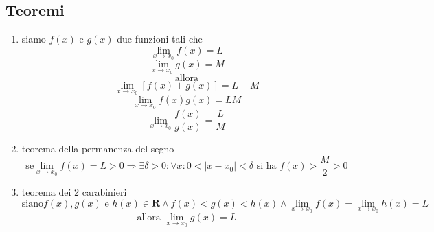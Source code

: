 \documentclass{exam}
\begin{document}
  \subsection{Teoremi}
    \begin{enumerate}
      \item siamo $f(x)$ e $g(x)$ due funzioni tali che
        \begin{displaymath}
          \lim_{x\to x_{0}}f(x)=L
        \end{displaymath}
        \begin{displaymath}
          \lim_{x\to x_{0}}g(x)=M
        \end{displaymath}
        \begin{displaymath}
          \textrm{allora}
        \end{displaymath}
        \begin{displaymath}
          \lim_{x \to x_{0}} [f(x)+g(x)]= L+M
        \end{displaymath}
        \begin{displaymath}
          \lim_{x \to x_{0}} f(x)g(x)=LM
        \end{displaymath}
        \begin{displaymath}
          \lim_{x\to x_{0}} \frac{f(x)}{g(x)}=\frac{L}{M}
        \end{displaymath}
      \item{teorema della permanenza del segno}
        \begin{displaymath}
          \textrm{se} \lim_{x\to x_{0}} f(x)=L>0 \Rightarrow \exists \delta >0 : \forall x :
          0<|x-x_{0}|<\delta \textrm{ si ha } f(x)>\frac{M}{2}>0
        \end{displaymath}
      \item{teorema dei 2 carabinieri}
        \begin{displaymath}
          \textrm{siano} f(x),g(x)\textrm{ e } h(x) \in \mathbf{R} \land f(x)<g(x)<h(x) 
          \land \lim_{x \to x_{0}}f(x)=\lim_{x \to x_{0}}h(x)=L
        \end{displaymath}
        \begin{displaymath}
          \textrm{allora }\lim_{x \to x_{0}}g(x)=L
        \end{displaymath}
    \end{enumerate}
  
  
  
\end{document}

